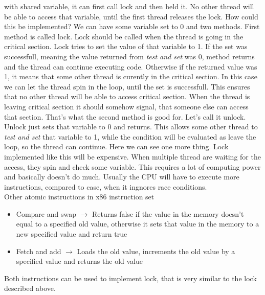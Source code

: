 \documentclass[a4paper]{article}
\begin{document}
with shared variable, it can first call lock and then held it. No other thread will be able
to access that variable, until the first thread releases the lock. How could this be
implemented? We can have some variable set to 0 and two methods. First method is called lock.
Lock should be called when the thread is going in the critical section. Lock tries to set
the value of that variable to 1. If the set was successfull, meaning the value returned 
from \textit{test and set} was 0, method returns and the thread can continue executing code.
Otherwise if the returned value was 1, it means that some other thread is curently in the
critical section. In this case we can let the thread spin in the loop, until
the set is successfull. This ensures that no other thread will be able to access critical
section. When the thread is leaving critical section it should somehow signal, that
someone else can access that section. That's what the second method is good for. Let's call
it unlock. Unlock just sets that variable to 0 and returns. This allows some other thread
to \textit{test and set} that variable to 1, while the condition will be evaluated as leave
the loop, so the thread can continue. Here we can see one more thing. Lock implemented 
like this will be expensive. When multiple thread are waiting for the access, they spin
and check some variable. This requires a lot of computing power and basically doesn't do much.
Usually the CPU will have to execute more instructions, compared to case, when it ingnores 
race conditions. \\
Other atomic instructions in x86 instruction set 
\begin{itemize}
  \item{Compare and swap $\rightarrow$ Returns false if the value in the memory doesn't equal
    to a specified old value, otherwise it sets that value in the memory to a new specified value
    and return true}
  \item{Fetch and add $\rightarrow$ Loads the old value, increments the old value by a specified 
    value and returns the old value}
\end{itemize}

\noindent Both instructions can be used to implement lock, that is very similar to the lock described 
above.

\newpage
\printbibliography
\end{document}
